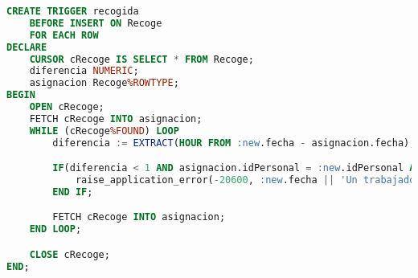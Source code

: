 \begin{lstlisting}[language=sql]
CREATE TRIGGER recogida
	BEFORE INSERT ON Recoge
	FOR EACH ROW
DECLARE
	CURSOR cRecoge IS SELECT * FROM Recoge;
	diferencia NUMERIC;
	asignacion Recoge%ROWTYPE;
BEGIN
	OPEN cRecoge;
	FETCH cRecoge INTO asignacion;
	WHILE (cRecoge%FOUND) LOOP
		diferencia := EXTRACT(HOUR FROM :new.fecha - asignacion.fecha);

		IF(diferencia < 1 AND asignacion.idPersonal = :new.idPersonal AND asignacion.año = :new.año) THEN
			raise_application_error(-20600, :new.fecha || 'Un trabajador no puede serle asignado un pedido con menos de 1 hora de diferencia');
		END IF;

		FETCH cRecoge INTO asignacion;
	END LOOP;

	CLOSE cRecoge;
END;
\end{lstlisting}
